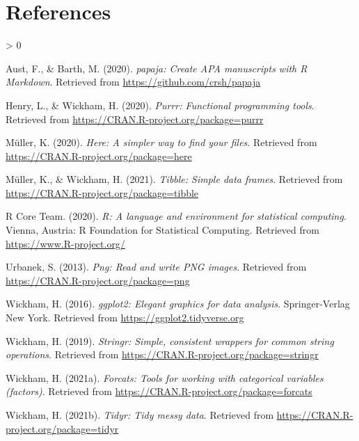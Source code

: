\documentclass[
  english,
  man]{apa6}
\newlength{\cslhangindent}
\newenvironment{CSLReferences}[2] %
 {%
  \setlength{\parindent}{0pt}
  \ifodd #1 \everypar{\setlength{\hangindent}{\cslhangindent}}\ignorespaces\fi
  \ifnum #2 > 0
  \setlength{\parskip}{#2\baselineskip}
  \fi
 }%
 {}
\begin{document}
\newpage

\hypertarget{references}{%
\section{References}\label{references}}

\begingroup
\setlength{\parindent}{-0.5in}
\setlength{\leftskip}{0.5in}

\hypertarget{refs}{}
\begin{CSLReferences}{1}{0}
\leavevmode\hypertarget{ref-R-papaja}{}%
Aust, F., \& Barth, M. (2020). \emph{{papaja}: {Create} {APA} manuscripts with {R Markdown}}. Retrieved from \url{https://github.com/crsh/papaja}

\leavevmode\hypertarget{ref-R-purrr}{}%
Henry, L., \& Wickham, H. (2020). \emph{Purrr: Functional programming tools}. Retrieved from \url{https://CRAN.R-project.org/package=purrr}

\leavevmode\hypertarget{ref-R-here}{}%
Müller, K. (2020). \emph{Here: A simpler way to find your files}. Retrieved from \url{https://CRAN.R-project.org/package=here}

\leavevmode\hypertarget{ref-R-tibble}{}%
Müller, K., \& Wickham, H. (2021). \emph{Tibble: Simple data frames}. Retrieved from \url{https://CRAN.R-project.org/package=tibble}

\leavevmode\hypertarget{ref-R-base}{}%
R Core Team. (2020). \emph{R: A language and environment for statistical computing}. Vienna, Austria: R Foundation for Statistical Computing. Retrieved from \url{https://www.R-project.org/}

\leavevmode\hypertarget{ref-R-png}{}%
Urbanek, S. (2013). \emph{Png: Read and write PNG images}. Retrieved from \url{https://CRAN.R-project.org/package=png}

\leavevmode\hypertarget{ref-R-ggplot2}{}%
Wickham, H. (2016). \emph{ggplot2: Elegant graphics for data analysis}. Springer-Verlag New York. Retrieved from \url{https://ggplot2.tidyverse.org}

\leavevmode\hypertarget{ref-R-stringr}{}%
Wickham, H. (2019). \emph{Stringr: Simple, consistent wrappers for common string operations}. Retrieved from \url{https://CRAN.R-project.org/package=stringr}

\leavevmode\hypertarget{ref-R-forcats}{}%
Wickham, H. (2021a). \emph{Forcats: Tools for working with categorical variables (factors)}. Retrieved from \url{https://CRAN.R-project.org/package=forcats}

\leavevmode\hypertarget{ref-R-tidyr}{}%
Wickham, H. (2021b). \emph{Tidyr: Tidy messy data}. Retrieved from \url{https://CRAN.R-project.org/package=tidyr}


\end{CSLReferences}
\end{document}
